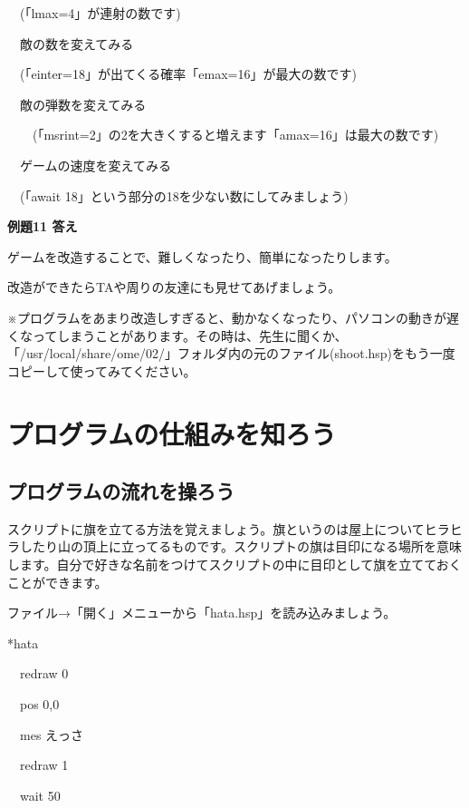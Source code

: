 \documentclass[a4paper,12pt]{jarticle}
\begin{document}
\ \ (「lmax=4」が連射の数です)

\ \ 敵の数を変えてみる

\ \ (「einter=18」が出てくる確率「emax=16」が最大の数です)

\ \ 敵の弾数を変えてみる

\ \ \ \ (「msrint=2」の2を大きくすると増えます「amax=16」は最大の数です)

\ \ ゲームの速度を変えてみる

\ \ (「await
18」という部分の18を少ない数にしてみましょう)

\bigskip
\bigskip

{\bfseries
例題11 答え}


\bigskip

ゲームを改造することで、難しくなったり、簡単になったりします。

改造ができたらTAや周りの友達にも見せてあげましょう。


\bigskip

※プログラムをあまり改造しすぎると、動かなくなったり、パソコンの動きが遅くなってしまうことがあります。その時は、先生に聞くか、「/usr/local/share/ome/02/」フォルダ内の元のファイル(shoot.hsp)をもう一度コピーして使ってみてください。




\clearpage
\section{プログラムの仕組みを知ろう}
\subsection{プログラムの流れを操ろう}
\bigskip
\bigskip

スクリプトに旗を立てる方法を覚えましょう。旗というのは屋上についてヒラヒラしたり山の頂上に立ってるものです。スクリプトの旗は目印になる場所を意味します。自分で好きな名前をつけてスクリプトの中に目印として旗を立てておくことができます。

ファイル→「開く」メニューから「hata.hsp」を読み込みましょう。


\bigskip

*hata

\ \ redraw 0

\ \ pos 0,0

\ \ mes {\textquotedbl}えっさ{\textquotedbl}

\ \ redraw 1

\ \ wait 50
\end{document}
